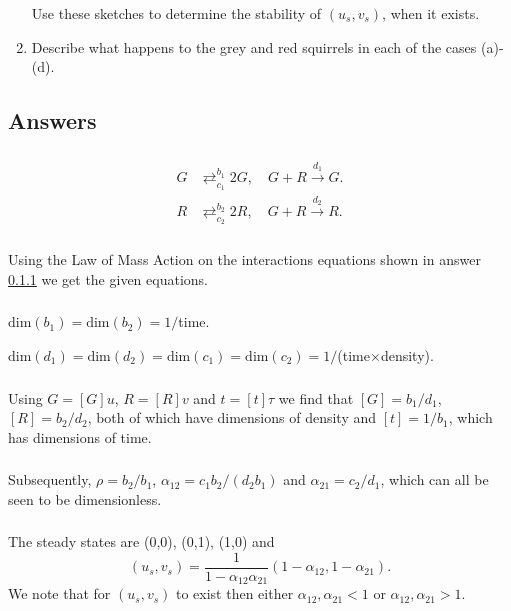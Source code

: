 \documentclass[]{article}
\newcommand{\bb}{\begin{equation}}
\newcommand{\ee}{\end{equation}}
\begin{document}
\begin{enumerate}
Use these sketches to determine the stability of $(u_s,v_s)$, when it exists.
\item Describe what happens to the grey and red squirrels in each of the cases (a)-(d).
\end{enumerate}
\begin{Answ}
\subsection{Answers}
\subsubsection{}\label{Interaction_equations}
\begin{align}
G&\mathrel{\mathop{\rightleftarrows}^{b_1}_{c_1}}2G,\quad G+R\stackrel{d_1}{\rightarrow}G.\\
R&\mathrel{\mathop{\rightleftarrows}^{b_2}_{c_2}}2R,\quad G+R\stackrel{d_2}{\rightarrow}R.
\end{align}
\subsubsection{}
Using the Law of Mass Action on the interactions equations shown in answer \ref{Interaction_equations} we get the given equations.
\subsubsection{}
$\textrm{dim}(b_1)=\textrm{dim}(b_2)=1/$time.

\noindent$\textrm{dim}(d_1)=\textrm{dim}(d_2)=\textrm{dim}(c_1)=\textrm{dim}(c_2)=1/$(time$\times$density).

\subsubsection{}
Using $G=[G]u$, $R=[R]v$ and $t= [t]\tau$ we find that $[G]=b_1/d_1$, $[R]=b_2/d_2$, both of which have dimensions of density and $[t]=1/b_1$, which has dimensions of time. 
\subsubsection{}
Subsequently, $\rho=b_2/b_1$, $\alpha_{12}=c_1b_2/(d_2b_1)$ and $\alpha_{21}=c_2/d_1$, which can all be seen to be dimensionless.
\subsubsection{}
The steady states are (0,0), (0,1), (1,0) and
\bb
(u_s,v_s)=\frac{1}{1-\alpha_{12}\alpha_{21}}(1-\alpha_{12},1-\alpha_{21}).
\ee
We note that for $(u_s,v_s)$ to exist then either $\alpha_{12}, \alpha_{21}<1$ or $\alpha_{12}, \alpha_{21}>1$.

\end{Answ}
\end{document}
